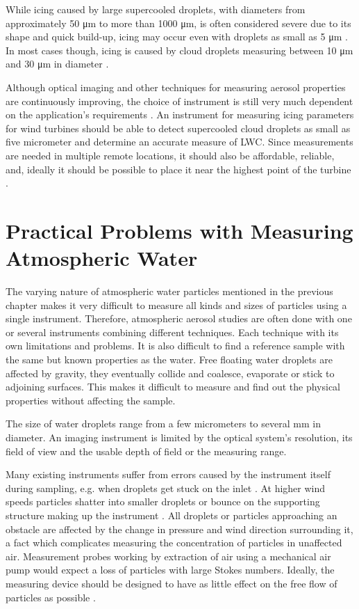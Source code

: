 While icing caused by large supercooled droplets, with diameters from approximately 50 μm to more than 1000 μm, is often considered severe due to its shape and quick build-up, icing may occur even with droplets as small as 5 μm \cite{sand1984, cob2001, homo2010}. In most cases though, icing is caused by cloud droplets measuring between 10 μm and 30 μm in diameter \cite{makk1992, cob2001}.

Although optical imaging and other techniques for measuring aerosol properties are continuously improving, the choice of instrument is still very much dependent on the application’s requirements \cite{ide1999, baum1983, baum2011, kulk2011}. An instrument for measuring icing parameters for wind turbines should be able to detect supercooled cloud droplets as small as five micrometer and determine an accurate measure of LWC. Since measurements are needed in multiple remote locations, it should also be affordable, reliable, and, ideally it should be possible to place it near the highest point of the turbine \cite{homo2006}.

\section{Practical Problems with Measuring Atmospheric Water}

The varying nature of atmospheric water particles mentioned in the previous chapter makes it very difficult to measure all kinds and sizes of particles using a single instrument. Therefore, atmospheric aerosol studies are often done with one or several instruments combining different techniques. Each technique with its own limitations and problems. It is also difficult to find a reference sample with the same but known properties as the water. Free floating water droplets are affected by gravity, they eventually collide and coalesce, evaporate or stick to adjoining  surfaces. This makes it difficult to measure and find out the physical properties without affecting the sample.

The size of water droplets range from a few micrometers to several mm in diameter. An imaging instrument is limited by the optical system's resolution, its field of view and the usable depth of field or the measuring range.

Many existing instruments suffer from errors caused by the instrument itself during sampling, e.g. when droplets get stuck on the inlet \cite{spie2012}. At higher wind speeds particles shatter into smaller droplets or bounce on the supporting structure making up the instrument \cite{cohen1991,field2006}. All droplets or particles approaching an obstacle are affected by the change in pressure and wind direction surrounding it, a fact which complicates measuring the concentration of particles in unaffected air. Measurement probes working by extraction of air using a mechanical air pump would expect a loss of particles with large Stokes numbers. Ideally, the measuring device should be designed to have as little effect on the free flow of particles as possible \cite{baum2011}.

